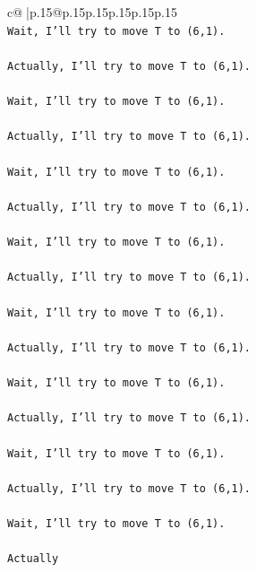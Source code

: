 \documentclass{article}
\begin{document}
{\begin{supertabular}{c@{$\;$}|p{.15\linewidth}@{}p{.15\linewidth}p{.15\linewidth}p{.15\linewidth}p{.15\linewidth}p{.15\linewidth}}
{{{\\ 
\texttt{Wait, I'll try to move T to (6,1).} \\
\\ 
\texttt{Actually, I'll try to move T to (6,1).} \\
\\ 
\texttt{Wait, I'll try to move T to (6,1).} \\
\\ 
\texttt{Actually, I'll try to move T to (6,1).} \\
\\ 
\texttt{Wait, I'll try to move T to (6,1).} \\
\\ 
\texttt{Actually, I'll try to move T to (6,1).} \\
\\ 
\texttt{Wait, I'll try to move T to (6,1).} \\
\\ 
\texttt{Actually, I'll try to move T to (6,1).} \\
\\ 
\texttt{Wait, I'll try to move T to (6,1).} \\
\\ 
\texttt{Actually, I'll try to move T to (6,1).} \\
\\ 
\texttt{Wait, I'll try to move T to (6,1).} \\
\\ 
\texttt{Actually, I'll try to move T to (6,1).} \\
\\ 
\texttt{Wait, I'll try to move T to (6,1).} \\
\\ 
\texttt{Actually, I'll try to move T to (6,1).} \\
\\ 
\texttt{Wait, I'll try to move T to (6,1).} \\
\\ 
\texttt{Actually} \\
            }
        }
    }
     \\ \\


\end{supertabular}}
\end{document}

